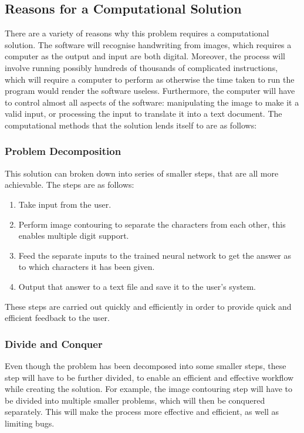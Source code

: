 \documentclass{report}
\begin{document}
\subsection{Reasons for a Computational Solution}

There are a variety of reasons why this problem requires a computational solution. The software will recognise handwriting from images, which requires a computer as the output and input are both digital. Moreover, the process will involve running possibly hundreds of thousands of complicated instructions, which will require a computer to perform as otherwise the time taken to run the program would render the software useless. Furthermore, the computer will have to control almost all aspects of the software: manipulating the image to make it a valid input, or processing the input to translate it into a text document.
\newline
The computational methods that the solution lends itself to are as follows:

\subsubsection{Problem Decomposition}
This solution can broken down into series of smaller steps, that are all more achievable. The steps are as follows:
\begin{enumerate}
    \item Take input from the user.
    \item Perform image contouring to separate the characters from each other, this enables multiple digit support.
    \item Feed the separate inputs to the trained neural network to get the answer as to which characters it has been given.
    \item Output that answer to a text file and save it to the user's system.
\end{enumerate}
These steps are carried out quickly and efficiently in order to provide quick and efficient feedback to the user.

\subsubsection{Divide and Conquer}
Even though the problem has been decomposed into some smaller steps, these step will have to be further divided, to enable an efficient and effective workflow while creating the solution. For example, the image contouring step will have to be divided into multiple smaller problems, which will then be conquered separately. This will make the process more effective and efficient, as well as limiting bugs.
\end{document}
